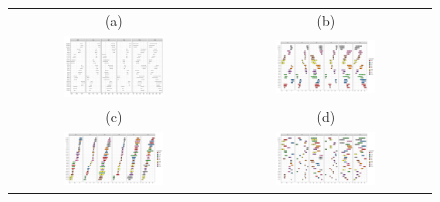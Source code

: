 \documentclass[article]{jss}
\begin{document}
\begin{appendix}
\begin{figure}[t!]
	\centering
	\begin{tabular}{cc}
		(a) & (b) \\ 
		\includegraphics[width=0.5\textwidth]{pic/index_allvar_origin} &
		\includegraphics[width=0.5\textwidth]{pic/index_allvar} \\ 
		(c) & (d) \\
		\includegraphics[width=0.5\textwidth]{pic/index_allvar_sort_c} &
		\includegraphics[width=0.5\textwidth]{pic/index_allvar_sort_r} 
	\end{tabular}
	\caption{\label{fig:index_allvar} }
\end{figure}




\end{appendix}
\end{document}
